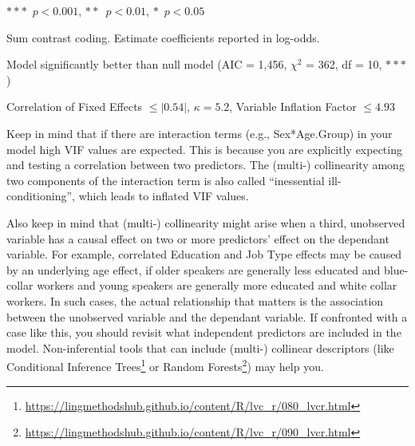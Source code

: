 \documentclass[
  10pt,
  letterpaper]{article}
\renewcommand\texttt[1]{{\ttfamily\color{BrickRed}#1}}
\DeclareRobustCommand{\href}[2]{#2\footnote{\url{#1}}}
\begin{document}
\begin{table}[h]
\begin{center}
\begin{threeparttable}
\begin{tablenotes}
\item \hfill$\ast\ast\ast$~$p<0.001$,  $\ast\ast$~$p<0.01$, $\ast$~$p<0.05$\\[-10pt]
\item  Sum contrast coding. Estimate coefficients reported in log-odds. 
\item Model significantly better than null model (AIC = 1,456, $\chi^2$ = 362, df = 10, $\ast\ast\ast$)
\item Correlation of Fixed Effects $\le|0.54|$, $\kappa = 5.2$, Variable Inflation Factor $\le4.93$ 
\end{tablenotes}
\end{threeparttable}
\end{center}
\end{table} 

Keep in mind that if there are interaction terms (e.g.,
\texttt{Sex*Age.Group}) in your model high VIF values are expected. This
is because you are explicitly expecting and testing a correlation
between two predictors. The (multi-) collinearity among two components
of the interaction term is also called ``inessential ill-conditioning'',
which leads to inflated VIF values.

Also keep in mind that (multi-) collinearity might arise when a third,
unobserved variable has a causal effect on two or more predictors'
effect on the dependant variable. For example, correlated Education and
Job Type effects may be caused by an underlying age effect, if older
speakers are generally less educated and blue-collar workers and young
speakers are generally more educated and white collar workers. In such
cases, the actual relationship that matters is the association between
the unobserved variable and the dependant variable. If confronted with a
case like this, you should revisit what independent predictors are
included in the model. Non-inferential tools that can include (multi-)
collinear descriptors (like
\href{https://lingmethodshub.github.io/content/R/lvc_r/080_lvcr.html}{Conditional
Inference Trees} or
\href{https://lingmethodshub.github.io/content/R/lvc_r/090_lvcr.html}{Random
Forests}) may help you.
\end{document}
